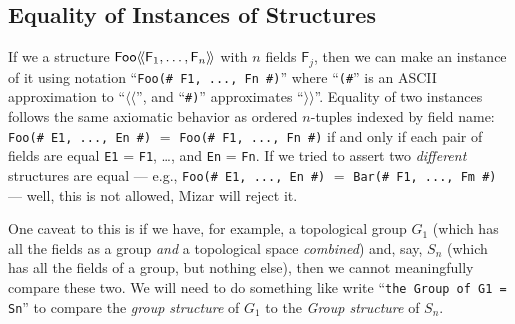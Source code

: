 \subsection{Equality of Instances of Structures}
If we a structure $\struct[Foo]{\mathsf{F}_{1},\dots,\mathsf{F}_{n}}$
with $n$ fields $\mathsf{F}_{j}$, then we can make an instance of it
using notation ``\verb$Foo(# F1, ..., Fn #)$'' where ``\verb$(#$'' is an
ASCII approximation to ``$\langle\!\langle$'', and ``\verb$#)$'' approximates
``$\rangle\!\rangle$''. Equality of two
instances follows the same axiomatic behavior as ordered $n$-tuples
indexed by field name:
\verb$Foo(# E1, ..., En #)$ $=$ \verb$Foo(# F1, ..., Fn #)$ if and only if each
pair of fields are equal
\lstinline{E1} = \lstinline{F1}, \dots, and \lstinline{En} = \lstinline{Fn}.
If we tried to assert two \emph{different} structures are equal --- e.g.,
\verb!Foo(# E1, ..., En #)! $=$ \verb$Bar(# F1, ..., Fm #)$ --- well, this is not
allowed, Mizar will reject it.

One caveat to this is if we have, for example, a topological group
$G_{1}$ (which has all the fields as a group \emph{and} a topological
space \emph{combined}) and, say, $S_{n}$ (which has all the fields of a
group, but nothing else), then we cannot meaningfully compare these
two. We will need to do something like write ``\lstinline{the Group of G1 = Sn}''
to compare the \emph{group structure} of $G_{1}$ to the \emph{Group structure}
of $S_{n}$.

